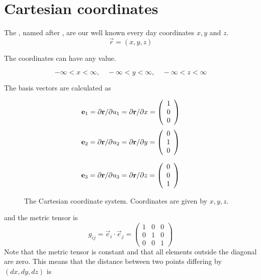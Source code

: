 \section{Cartesian coordinates}
The , named after , are our well known every day
coordinates $x,y$ and $z$.
$$
  \vec{r} = (x,y,z) 
$$

The coordinates can have any value.

$$
   -\infty<x<\infty,\quad  -\infty<y<\infty,\quad  -\infty<z<\infty
$$

The basis vectors are calculated as  

\begin{figure}[h!]
\begin{minipage}{0.5\linewidth}
$$ 
   \mathbf{e}_1 = \partial\mathbf{r}/\partial u_1 =\partial\mathbf{r}/\partial x = \left( \begin{array}{ccc} 1 \\ 0 \\ 0 \end{array} \right) 
$$ 
$$ 
   \mathbf{e}_2 = \partial\mathbf{r}/\partial u_2 =\partial\mathbf{r}/\partial y =  \left( \begin{array}{ccc} 0 \\ 1 \\ 0 \end{array} \right) 
$$

$$ 
   \mathbf{e}_3 = \partial\mathbf{r}/\partial u_3 =\partial\mathbf{r}/\partial z = \left( \begin{array}{ccc} 0 \\ 0 \\ 1 \end{array} \right) 
$$
\end{minipage}
\begin{minipage}{0.5\linewidth}
  \begin{center}
  \end{center}
  \caption{\small The Cartesian coordinate system. Coordinates are given by $x,y,z$.}
\end{minipage}
\end{figure}




and the metric tensor is
$$
   g_{ij} = \vec{e}_i\cdot\vec{e}_j=  \left( \begin{array}{ccc}
                    1 & 0 & 0 \\
                    0 & 1 & 0 \\
                    0 & 0 & 1 
                    \end{array} 
             \right)
$$
Note that the metric tensor is constant and that all elements outside the diagonal are zero.
This means that the distance between two points differing by $(dx, dy, dz)$ is

